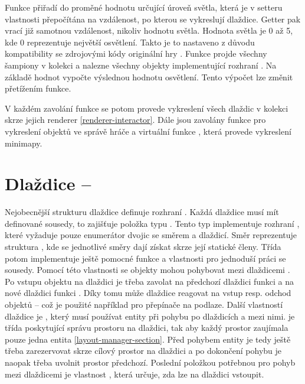 Funkce  přiřadí do proměné  hodnotu určující úroveň světla, která je v setteru
vlastnosti přepočítána na vzdálenost, po kterou se vykreslují dlaždice. Getter pak vrací již samotnou vzdálenost,
nikoliv hodnotu světla. Hodnota světla je 0 až 5, kde 0 reprezentuje největší osvětlení. Takto je to nastaveno
z důvodu kompatibility se zdrojovými kódy originální hry \cite{DMDecompilation}. 
 Funkce projde všechny šampiony v kolekci  a nalezne všechny 
objekty implementující rozhraní . Na základě hodnot  vypočte 
výslednou hodnotu osvětlení. Tento výpočet lze změnit přetížením funkce. 

V každém zavolání funkce  se potom provede vykreslení všech dlaždic v kolekci 
skrze jejich renderer \vref{renderer-interactor}. Dále jsou zavolány funkce  pro vykreslení objektů
ve správě hráče a virtuální funkce , která provede vykreslení minimapy.


\section{Dlaždice -- }
Nejobecnější strukturu dlaždice definuje rozhraní . Každá dlaždice musí mít definované sousedy,
to zajišťuje položka  typu . Tento typ implementuje rozhraní ,
které vyžaduje pouze enumerátor dvojic se směrem a dlaždicí. Směr reprezentuje struktura , kde
se jednotlivé směry dají získat skrze její statické členy. Třída  potom implementuje ještě
pomocné funkce a vlastnosti pro jednoduší práci se sousedy. Pomocí této vlastnosti se objekty mohou pohybovat
mezi dlaždicemi . Po vstupu objektu na dlaždici je třeba zavolat na předchozí dlaždici funkci  a
na nové dlaždici funkci . Díky tomu může dlaždice reagovat na vstup resp. odchod objektů --
což je použité například pro přepínače na podlaze. Další vlastností dlaždice je , který 
musí používat entity při pohybu po dlaždicích a mezi nimi.  je třída poskytující správu prostoru
na dlaždici, tak aby každý prostor zaujímala pouze jedna entita \vref{layout-manager-section}. Před pohybem entity je
tedy ještě třeba zarezervovat skrze  cílový prostor na dlaždici a po dokončení pohybu
je naopak třeba uvolnit prostor předchozí. Poslední položkou potřebnou pro pohyb mezi dlaždicemi je vlastnost
, která určuje, zda lze na dlaždici vstoupit.


